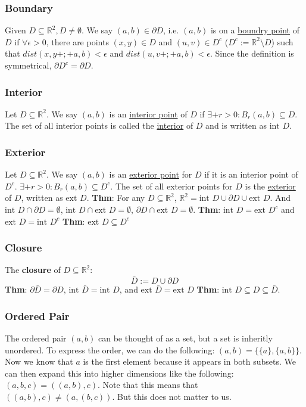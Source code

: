 \documentclass[11 pt, twoside]{article}
\begin{document}
\subsubsection{Boundary}
Given $D \subseteq \mathbb{R}^2, D \neq \emptyset$. We say $(a, b) \in
\partial D$, i.e. $(a, b)$ is on a \underline{boundry point} of $D$ if $\forall
\epsilon > 0$, there are points $(x, y)\in D$ and $(u, v) \in D^c$ ($D^c :=
\mathbb{R}^2 \setminus D$) such that $dist(x, y+;+ a, b) < \epsilon$ and
$dist(u, v+;+ a, b) < \epsilon$. Since the definition is symmetrical, $\partial D^c = \partial D$.

\subsubsection{Interior}
Let $D \subseteq \mathbb{R}^2$. We say $(a, b)$ is an
\underline{interior point} of $D$ if $\exists+ r > 0:B_r(a, b)\subseteq D$.
The set of all interior points is called the \underline{interior} of $D$ and is
written as $\text{int } D$.

\subsubsection{Exterior}
Let $D \subseteq \mathbb{R}^2$. We say $(a, b)$ is an
\underline{exterior point} for $D$ if it is an interior point of $D^c$.
$\exists+ r > 0: B_r(a, b) \subseteq D^c$.
The set of all exterior points for $D$ is the \underline{exterior} of $D$,
written as $\text{ext } D$.
\textbf{Thm}: For any $D \subseteq \mathbb{R}^2$, $\mathbb{R}^2 =
\text{int } D \cup \partial D \cup \text{ext } D$. And $\text{int } D \cap
\partial D = \emptyset$, $\text{int } D \cap \text{ext } D = \emptyset$,
$\partial D \cap \text{ext } D = \emptyset$.
\textbf{Thm}: $\text{int } D = \text{ext } D^c$ and $\text{ext } D =
\text{int } D^c$
\textbf{Thm}: $\text{ext } D \subseteq D^c$

\subsubsection{Closure}
The \textbf{closure} of $D \subseteq \mathbb{R}^2$:
$$\bar{D} := D \cup \partial D$$
\textbf{Thm}: $\partial \bar{D} = \partial D$, $\text{int } \bar{D} =
\text{int } D$, and $\text{ext } \bar{D} = \text{ext } D$
\textbf{Thm}: $\text{int } D \subseteq D \subseteq \bar{D}$.

\subsubsection{Ordered Pair}
The ordered pair $(a, b)$ can be thought of as a set, but a set is inheritly
unordered. To express the order, we can do the following: $(a, b) = \{\{a\},
\{a, b\}\}$. Now we know that $a$ is the first element because it appears in
both subsets.
We can then expand this into higher dimensions like the following:
$(a, b, c) = ((a, b), c)$. Note that this means that $((a, b), c) \neq (a, (b,
c))$. But this does not matter to us.
\end{document}

